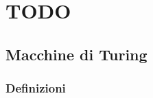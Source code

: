 \documentclass[a4paper, 12pt]{report}
\begin{document}

    \chapter{TODO}

    \section{Macchine di Turing}

    \subsection{Definizioni}
\end{document}
